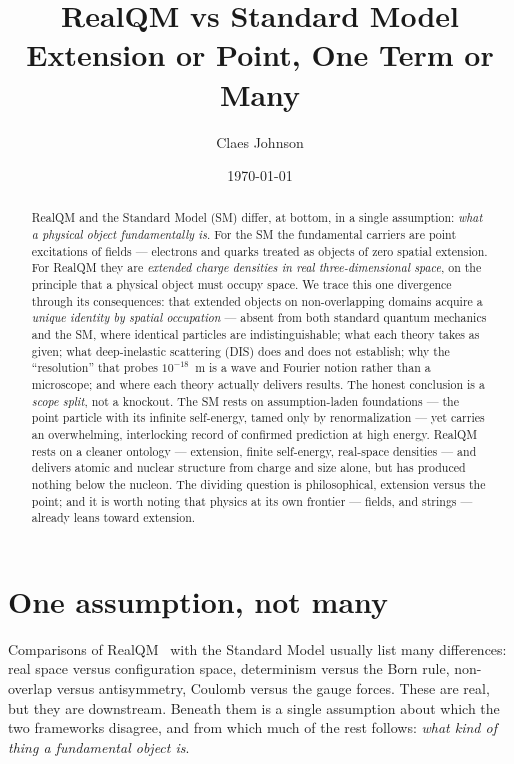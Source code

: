 \documentclass[11pt]{article}
\title{RealQM vs Standard Model\\
\large Extension or Point, One Term or Many}
\author[1]{Claes Johnson}
\affil[1]{KTH Royal Institute of Technology, SE-100 44 Stockholm, Sweden \\
\texttt{claesjohnson@gmail.com}}
\date{\today}
\begin{document}
\maketitle

\begin{abstract}
RealQM and the Standard Model (SM) differ, at bottom, in a single assumption: \emph{what a physical
object fundamentally is}. For the SM the fundamental carriers are point excitations of fields --- electrons
and quarks treated as objects of zero spatial extension. For RealQM they are \emph{extended charge
densities in real three-dimensional space}, on the principle that a physical object must occupy space. We
trace this one divergence through its consequences: that extended objects on non-overlapping domains
acquire a \emph{unique identity by spatial occupation} --- absent from both standard quantum mechanics and
the SM, where identical particles are indistinguishable; what each theory takes as given; what
deep-inelastic scattering (DIS) does and does not establish; why the ``resolution'' that probes
$10^{-18}$~m is a wave and Fourier notion rather than a microscope; and where each theory actually
delivers results. The honest
conclusion is a \emph{scope split}, not a knockout. The SM rests on assumption-laden foundations --- the
point particle with its infinite self-energy, tamed only by renormalization --- yet carries an
overwhelming, interlocking record of confirmed prediction at high energy. RealQM rests on a cleaner
ontology --- extension, finite self-energy, real-space densities --- and delivers atomic and nuclear
structure from charge and size alone, but has produced nothing below the nucleon. The dividing question is
philosophical, extension versus the point; and it is worth noting that physics at its own frontier ---
fields, and strings --- already leans toward extension.
\end{abstract}


\section{One assumption, not many}
\label{sec:one}

Comparisons of RealQM~\cite{RealQM} with the Standard Model usually list many differences: real space versus
configuration space, determinism versus the Born rule, non-overlap versus antisymmetry, Coulomb versus the
gauge forces. These are real, but they are downstream. Beneath them is a single assumption about which the
two frameworks disagree, and from which much of the rest follows: \emph{what kind of thing a fundamental
object is}.
\end{document}
